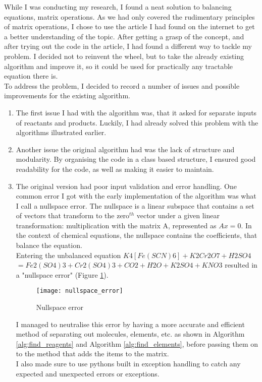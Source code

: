 \documentclass[a4paper,12pt]{article}
\begin{document}
While I was conducting my research, I found a neat solution to balancing equations, matrix operations. As we had only covered the rudimentary principles of matrix operations, I chose to use the article I had found on the internet to get a better understanding of the topic. After getting a grasp of the concept, and after trying out the code in the article, I had found a different way to tackle my problem. I decided not to reinvent the wheel, but to take the already existing algorithm and improve it, so it could be used for practically any tractable equation there is.\\
To address the problem, I decided to record a number of issues and possible improvements for the existing algorithm.

\begin{enumerate}
\item The first issue I had with the algorithm was, that it asked for separate inputs of reactants and products. Luckily, I had already solved this problem with the algorithms illustrated earlier.
\item Another issue the original algorithm had was the lack of structure and modularity. By organising the code in a class based structure, I ensured good readability for the code, as well as making it easier to maintain.
\item The original version had poor input validation and error handling. One common error I got with the early implementation of the algorithm was what I call a nullspace error. The nullspace is a linear subspace that contains a set of vectors that transform to the zero$^{th}$ vector under a given linear transformation: multiplication with the matrix A, represented as $ Ax = 0$. In the context of chemical equations, the nullspace contains the coefficients, that balance the equation.\\
Entering the unbalanced equation $ K4[Fe(SCN)6] + K2Cr2O7 + H2SO4$\\ $ = Fe2(SO4)3 + Cr2(SO4)3 + CO2 + H2O + K2SO4 + KNO3$ resulted in a "nullspace error" (Figure \ref{fig:nullspace_error}). 

\newpage

\begin{figure} [h]
	\centering
	\texttt{[image: nullspace\_error]}
	\caption{Nullspace error}
	\label{fig:nullspace_error}
\end{figure}

I managed to neutralise this error by having a more accurate and efficient method of separating out molecules, elements, etc. as shown in Algorithm \ref{alg:find_reagents} and Algorithm \ref{alg:find_elements}, before passing them on to the method that adds the items to the matrix.\\
I also made sure to use pythons built in exception handling to catch any expected and unexpected errors or exceptions.
\end{enumerate}
\end{document}
